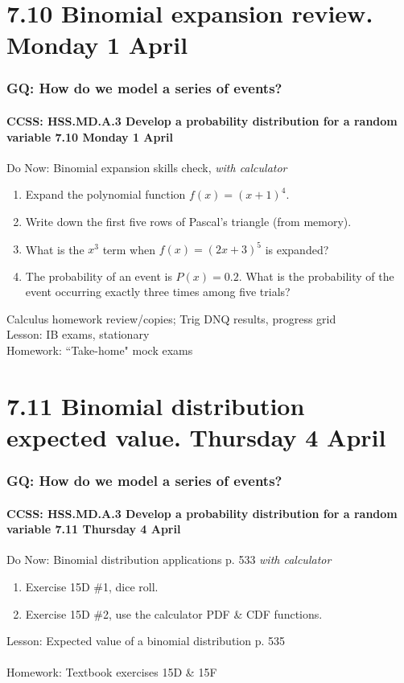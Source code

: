 \documentclass{beamer}
\begin{document}
\section{7.10 Binomial expansion review. Monday 1 April}
  \frame
  {
    \frametitle{GQ: How do we model a series of events?}
    \framesubtitle{CCSS: HSS.MD.A.3 Develop a probability distribution for a random variable \hfill \alert{7.10 Monday 1 April}}

    \begin{block}{Do Now: Binomial expansion skills check, \emph{with calculator}}
    \begin{enumerate}
      \item Expand the polynomial function $f(x)=(x+1)^4$.
      \item Write down the first five rows of Pascal's triangle (from memory).
      \item What is the $x^3$ term when $f(x)=(2x+3)^5$ is expanded?
      \item The probability of an event is $P(x)=0.2$. What is the probability of the event occurring exactly three times among five trials?
    \end{enumerate}
    \end{block}
    Calculus homework review/copies; Trig DNQ results, progress grid\\
    Lesson: IB exams, stationary\\
    Homework: ``Take-home" mock exams
  }

\section{7.11 Binomial distribution expected value. Thursday 4 April}
  \frame
  {
    \frametitle{GQ: How do we model a series of events?}
    \framesubtitle{CCSS: HSS.MD.A.3 Develop a probability distribution for a random variable \hfill \alert{7.11 Thursday 4 April}}

    \begin{block}{Do Now: Binomial distribution applications p. 533 \emph{with calculator}}
    \begin{enumerate}
      \item Exercise 15D \#1, dice roll.
      \item Exercise 15D \#2, use the calculator PDF \& CDF functions.
    \end{enumerate}
    \end{block}
    Lesson: Expected value of a binomial distribution p. 535\\
    \\
    Homework: Textbook exercises 15D \& 15F
  }
\end{document}
